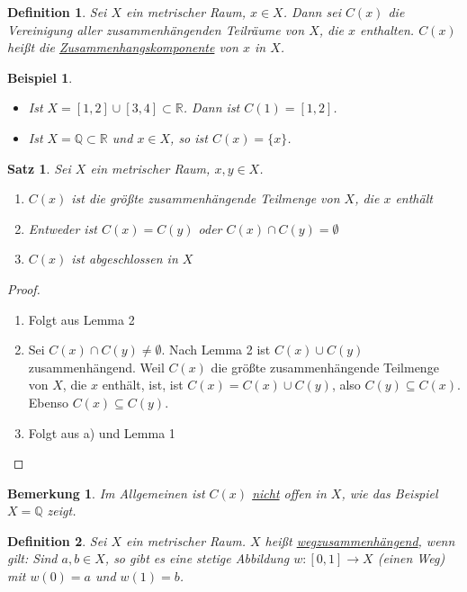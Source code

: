 \documentclass[10pt,a4paper]{report}
\newtheorem{satz}{Satz}
\newtheorem*{defi}{Definition}
\newtheorem*{remark}{Bemerkung}
\newtheorem*{example}{Beispiel}
\begin{document}
\begin{defi}
  Sei $X$ ein metrischer Raum, $x \in X$.
  Dann sei $C(x)$ die Vereinigung aller zusammenhängenden Teilräume von $X$, die $x$ enthalten.
  $C(x)$ heißt die \underline{Zusammenhangskomponente} von $x$ in $X$.
\end{defi}

\begin{example}
  \begin{itemize}
  \item Ist $X = [1, 2] \cup [3, 4] \subset \mathbb{R}$.
    Dann ist $C(1) = [1, 2]$.
  \item Ist $X = \mathbb{Q} \subset \mathbb{R}$ und $x \in X$, so ist $C(x) = \{ x \}$.
  \end{itemize}
\end{example}

\begin{satz}
  Sei $X$ ein metrischer Raum, $x, y \in X$.
  \begin{enumerate}[label={\alph*)}]
  \item $C(x)$ ist die größte zusammenhängende Teilmenge von $X$, die $x$ enthält
  \item Entweder ist $C(x) = C(y)$ oder $C(x) \cap C(y) = \emptyset$
  \item $C(x)$ ist abgeschlossen in $X$
  \end{enumerate}
\end{satz}

\begin{proof}
  \begin{enumerate}[label={\alph*)}]
  \item Folgt aus Lemma 2
  \item Sei $C(x) \cap C(y) \ne \emptyset$.
    Nach Lemma 2 ist $C(x) \cup C(y)$ zusammenhängend.
    Weil $C(x)$ die größte zusammenhängende Teilmenge von $X$, die $x$ enthält, ist, ist $C(x) = C(x) \cup C(y)$, also $C(y) \subseteq C(x)$.
    Ebenso $C(x) \subseteq C(y)$.
  \item Folgt aus a) und Lemma 1
  \end{enumerate}
\end{proof}

\begin{remark}
  Im Allgemeinen ist $C(x)$ \underline{nicht} offen in $X$, wie das Beispiel $X = \mathbb{Q}$ zeigt.
\end{remark}

\begin{defi}
  Sei $X$ ein metrischer Raum.
  $X$ heißt \underline{wegzusammenhängend}, wenn gilt:
  Sind $a, b \in X$, so gibt es eine stetige Abbildung $w : [0, 1] \rightarrow X$ (einen Weg) mit $w(0) = a$ und $w(1) = b$.
\end{defi}
\end{document}
